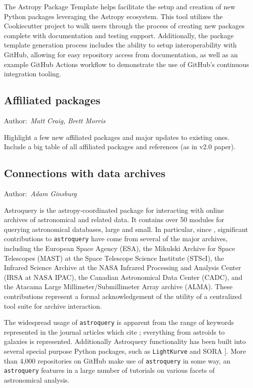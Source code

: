 \documentclass[modern]{aastex631}
\newcommand{\paperii}{\cite{astropy:2018}}
\newcommand{\secauthor}[1]{{\color{blue}Author:~\textit{#1}}}
\begin{document}
The Astropy Package Template helps facilitate the setup and creation of new
Python packages leveraging the Astropy ecosystem. This tool utilizes the
Cookiecutter project to walk users through the process of creating new
packages complete with documentation and testing support. Additionally, the
package template generation process includes the ability to setup
interoperability with GitHub, allowing for easy repository access from
documentation, as well as an example GitHub Actions workflow to demonstrate
the use of GitHub's continuous integration tooling.

\subsection{Affiliated packages}

\secauthor{Matt Craig, Brett Morris}

Highlight a few new affiliated packages and major updates to existing ones.
Include a big table of all affiliated packages and references (as in v2.0
paper).

\subsection{Connections with data archives}

\label{sec:astroquery}

\secauthor{Adam Ginsburg}

Astroquery \cite{Ginsburg2019} is the astropy-coordinated package for interacting with online archives of astronomical and related data. It contains over 50 modules for querying astronomical databases, large and small. In particular, since \paperii, significant contributions to \texttt{astroquery} have come from several of the major archives, including the European Space Agency (ESA), the Mikulski Archive for Space Telescopes (MAST) at the Space Telescope Science Institute (STScI), the Infrared Science Archive at the NASA Infrared Processing and Analysis Center (IRSA at NASA IPAC), the Canadian Astronomical Data Center (CADC), and the Atacama Large Millimeter/Submillimeter Array archive (ALMA). These contributions represent a formal acknowledgement of the utility of a centralized tool suite for archive interaction.

The widespread usage of \texttt{astroquery} is apparent from the range of keywords represented in the journal articles which cite \cite{Ginsburg2019}; everything from astroids to galaxies is represented. Additionally Astroquery functionality has been built into several special purpose Python packages, such as \texttt{LightKurve} \cite{LightKurve} and SORA \cite{SORA}]. More than 4,000 repositories on GitHub make use of \texttt{astroquery} in some way, an \texttt{astroquery} features in a large number of tutorials on various facets of astronomical analysis.
\end{document}
